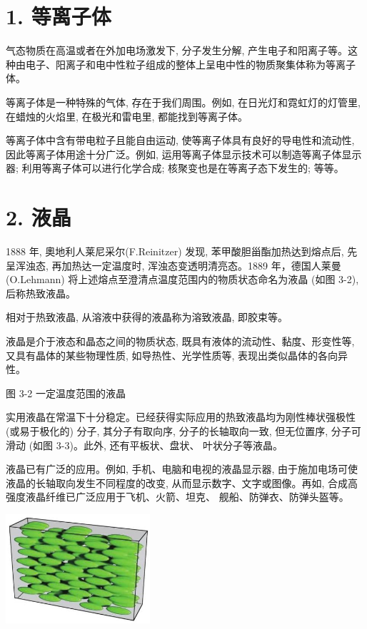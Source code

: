 \documentclass[10pt]{article}
\begin{document}
\section*{1. 等离子体}

气态物质在高温或者在外加电场激发下, 分子发生分解, 产生电子和阳离子等。这种由电子、阳离子和电中性粒子组成的整体上呈电中性的物质聚集体称为等离子体。

等离子体是一种特殊的气体, 存在于我们周围。例如, 在日光灯和霓虹灯的灯管里, 在蜡烛的火焰里, 在极光和雷电里, 都能找到等离子体。

等离子体中含有带电粒子且能自由运动, 使等离子体具有良好的导电性和流动性, 因此等离子体用途十分广泛。例如, 运用等离子体显示技术可以制造等离子体显示器; 利用等离子体可以进行化学合成; 核聚变也是在等离子态下发生的; 等等。

\section*{2. 液晶}

1888 年, 奧地利人莱尼采尔(F.Reinitzer) 发现, 苯甲酸胆甾酯加热达到熔点后, 先呈浑浊态, 再加热达一定温度时, 浑浊态变透明清亮态。1889 年，德国人莱曼 (O.Lehmann) 将上述熔点至澄清点温度范围内的物质状态命名为液晶 (如图 3-2), 后称热致液晶。

相对于热致液晶, 从溶液中获得的液晶称为溶致液晶, 即胶束等。

液晶是介于液态和晶态之间的物质状态, 既具有液体的流动性、黏度、形变性等, 又具有晶体的某些物理性质, 如导热性、光学性质等, 表现出类似晶体的各向异性。

图 3-2 一定温度范围的液晶

实用液晶在常温下十分稳定。已经获得实际应用的热致液晶均为刚性棒状强极性 (或易于极化的) 分子, 其分子有取向序, 分子的长轴取向一致, 但无位置序, 分子可滑动 (如图 3-3)。此外, 还有平板状、盘状、 叶状分子等液晶。

液晶已有广泛的应用。例如, 手机、电脑和电视的液晶显示器, 由于施加电场可使液晶的长轴取向发生不同程度的改变, 从而显示数字、文字或图像。再如, 合成高强度液晶纤维已广泛应用于飞机、火箭、坦克、 舰船、防弹衣、防弹头盔等。

\begin{center}
\includegraphics[max width=0.4\textwidth]{images/0190e026-5a11-7df7-bd27-54d09026ba7a_72_724359.jpg}
\end{center}
\end{document}
